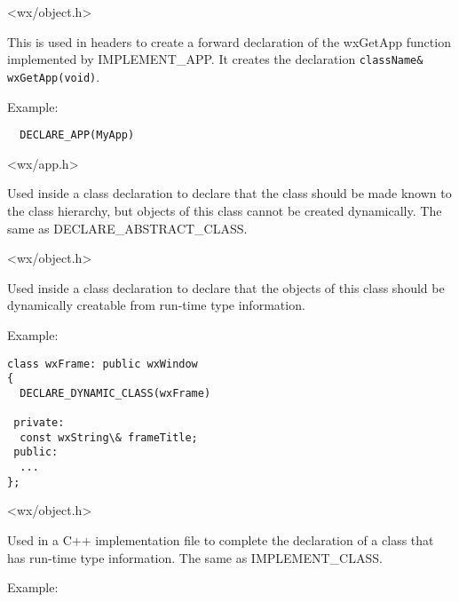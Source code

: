 
<wx/object.h>

\label{declareapp}


This is used in headers to create a forward declaration of the wxGetApp function implemented
by IMPLEMENT\_APP. It creates the declaration {\tt className\& wxGetApp(void)}.

Example:

\begin{verbatim}
  DECLARE_APP(MyApp)
\end{verbatim}


<wx/app.h>



Used inside a class declaration to declare that the class should be
made known to the class hierarchy, but objects of this class cannot be created
dynamically. The same as DECLARE\_ABSTRACT\_CLASS.


<wx/object.h>



Used inside a class declaration to declare that the objects of this class should be dynamically
creatable from run-time type information.

Example:

\begin{verbatim}
class wxFrame: public wxWindow
{
  DECLARE_DYNAMIC_CLASS(wxFrame)

 private:
  const wxString\& frameTitle;
 public:
  ...
};
\end{verbatim}


<wx/object.h>



Used in a C++ implementation file to complete the declaration of
a class that has run-time type information. The same as IMPLEMENT\_CLASS.

Example:


